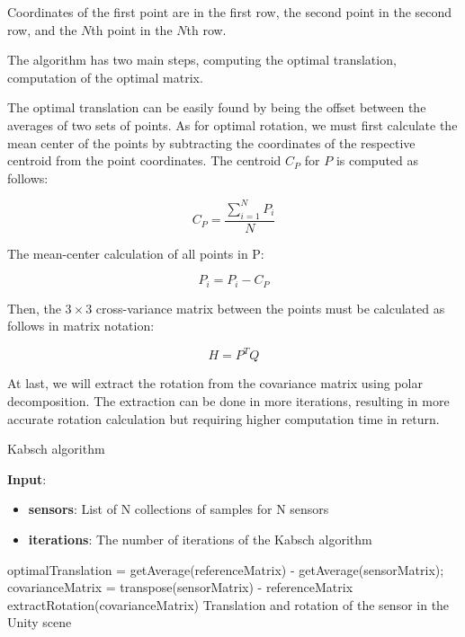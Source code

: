 Coordinates of the first point are in the first row, the second point in the second row, and the $N$th point in the $N$th row.

The algorithm has two main steps, computing the optimal translation, computation of the optimal matrix.

The optimal translation can be easily found by being the offset between the averages of two sets of points. As for optimal rotation, we must first calculate the mean center of the points by subtracting the coordinates of the respective centroid from the point coordinates. The centroid $C_P$ for $P$ is computed as follows:

\begin{equation}
    {C_P = {\frac{\sum_{i=1}^{N}P_i}{N}}}
\end{equation}

The mean-center calculation of all points in P:

\begin{equation}
    {P_i = P_i - C_P}
\end{equation}

Then, the $3\times3$ cross-variance matrix between the points must be calculated as follows in matrix notation:

\begin{equation}
    {H = P^T Q}
\end{equation}

At last, we will extract the rotation from the covariance matrix using polar decomposition. The extraction can be done in more iterations, resulting in more accurate rotation calculation but requiring higher computation time in return.

\begin{algorithm}
	\caption{Kabsch algorithm}
	\label{alg:devicePositioning}
	\hspace*{\algorithmicindent} \textbf{Input}: 
	    \begin{itemize}
	        \item \textbf{sensors}: List of N collections of samples for N sensors
	        \item \textbf{iterations}: The number of iterations of the Kabsch algorithm
	    \end{itemize}
	\begin{algorithmic}[1]
		    \State optimalTranslation = getAverage(referenceMatrix) - getAverage(sensorMatrix);
			\State covarianceMatrix = transpose(sensorMatrix) - referenceMatrix
		    	\State extractRotation(covarianceMatrix)
		    \EndFor
		    \State Translation and rotation of the sensor in the Unity scene
		\EndFor
	\end{algorithmic} 
\end{algorithm}

